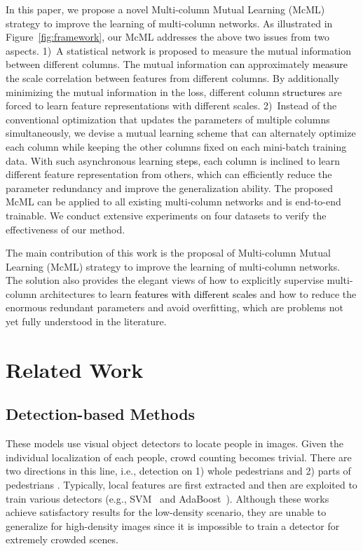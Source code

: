 \documentclass[sigconf]{acmart}
\newcommand{\ljx}[1]{\textcolor{black}{#1}}
\newcommand{\czq}[1]{\textcolor{black}{#1}}
\begin{document}
In this paper, we propose a novel Multi-column Mutual Learning (McML) strategy to improve the learning of multi-column networks.
As illustrated in Figure~\ref{fig:framework}, our McML addresses the above two issues from two aspects.
1)~A statistical network is proposed to measure the mutual information between different columns.
The mutual information \czq{can} approximately \czq{measure} the scale correlation between features from different columns.
By additionally minimizing the mutual information in the loss, different column
\czq{structures} are forced to learn feature representations with different scales.
2)~Instead of the conventional optimization that updates the parameters of multiple columns simultaneously, we devise a mutual learning scheme that can alternately optimize each column while keeping the other columns fixed on each mini-batch training data. With such asynchronous learning \czq{steps}, each column is inclined to learn different feature representation from others, which can efficiently reduce the parameter redundancy and improve the generalization ability.
The proposed McML can be applied to all existing multi-column networks and is end-to-end trainable.
We conduct extensive experiments on four datasets to verify the effectiveness of our method.

The main contribution of this work is the proposal of Multi-column Mutual Learning (McML) strategy to improve the learning of multi-column networks.
The solution also provides the elegant views of how to explicitly supervise multi-column architectures to learn \ljx{features with different scales} and how to reduce the enormous redundant parameters and avoid overfitting, which are problems not yet fully understood in the literature.



\section{Related Work}
\label{sec:related-work}
\subsection{Detection-based Methods}
These models use visual object detectors to locate people in images. 
Given the individual localization of each people, crowd counting becomes trivial. 
There are two directions in this line, i.e., detection on 1) whole pedestrians \cite{d-bayesian-full-06,d-histograms-svm-full-05,d-haar-adaboost-full-01,d-full-bayesian-08} and 2) parts of pedestrians \cite{d-part2-08,d-part-15,d-harr-svm-part-01,d-part-11}. 
Typically, local features \cite{d-histograms-svm-full-05,d-harr-svm-part-01} are first extracted and then are exploited to train various detectors (e.g., SVM~\cite{d-harr-svm-part-01} and AdaBoost~\cite{d-adaboost-full-05}).
Although these works achieve satisfactory results for the low-density scenario, they are unable to generalize for high-density images since it is impossible to train a detector for extremely crowded scenes.
\end{document}
